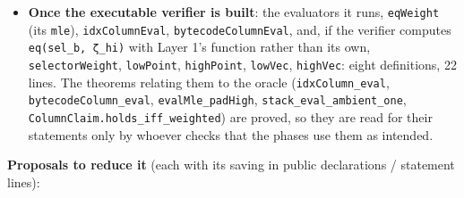 \begin{itemize}
\item \textbf{Once the executable verifier is built}: the evaluators it runs, \texttt{eqWeight} (its \texttt{mle}), \texttt{idxColumnEval}, \texttt{bytecodeColumnEval}, and, if the verifier computes \texttt{eq(\allowbreak{}sel\_\allowbreak{}b,\allowbreak{} ζ\_\allowbreak{}hi)} with Layer 1's function rather than its own, \texttt{selectorWeight}, \texttt{lowPoint}, \texttt{highPoint}, \texttt{lowVec}, \texttt{highVec}: eight definitions, 22 lines. The theorems relating them to the oracle (\texttt{idxColumn\_\allowbreak{}eval}, \texttt{bytecodeColumn\_\allowbreak{}eval}, \texttt{evalMle\_\allowbreak{}padHigh}, \texttt{stack\_\allowbreak{}eval\_\allowbreak{}ambient\_\allowbreak{}one}, \texttt{C\allowbreak{}o\allowbreak{}l\allowbreak{}u\allowbreak{}m\allowbreak{}n\allowbreak{}C\allowbreak{}l\allowbreak{}a\allowbreak{}i\allowbreak{}m\allowbreak{}.\allowbreak{}h\allowbreak{}o\allowbreak{}l\allowbreak{}d\allowbreak{}s\allowbreak{}\_\allowbreak{}i\allowbreak{}f\allowbreak{}f\allowbreak{}\_\allowbreak{}w\allowbreak{}e\allowbreak{}i\allowbreak{}g\allowbreak{}h\allowbreak{}t\allowbreak{}e\allowbreak{}d}) are proved, so they are read for their statements only by whoever checks that the phases use them as intended.
\end{itemize}

\textbf{Proposals to reduce it} (each with its saving in public declarations / statement lines):

